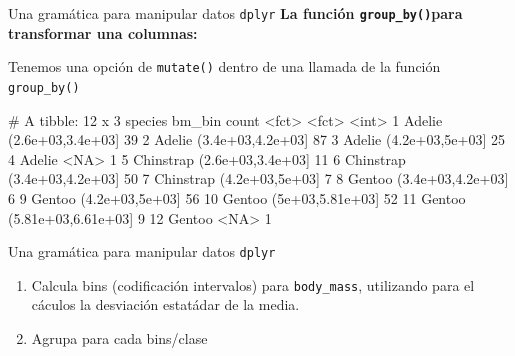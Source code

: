 \documentclass[
  ignorenonframetext,
  aspectratio=169]{beamer}
\newenvironment{Shaded}{\begin{snugshade}}{\end{snugshade}}
\newcommand{\AttributeTok}[1]{\textcolor[rgb]{0.13,0.29,0.53}{#1}}
\newcommand{\DecValTok}[1]{\textcolor[rgb]{0.00,0.00,0.81}{#1}}
\newcommand{\FunctionTok}[1]{\textcolor[rgb]{0.13,0.29,0.53}{\textbf{#1}}}
\newcommand{\NormalTok}[1]{#1}
\newcommand{\OtherTok}[1]{\textcolor[rgb]{0.56,0.35,0.01}{#1}}
\newcommand{\SpecialCharTok}[1]{\textcolor[rgb]{0.81,0.36,0.00}{\textbf{#1}}}
\newcommand{\StringTok}[1]{\textcolor[rgb]{0.31,0.60,0.02}{#1}}
\providecommand{\tightlist}{%
  \setlength{\itemsep}{0pt}\setlength{\parskip}{0pt}}
\let\oldverbatim\verbatim
\let\endoldverbatim\endverbatim
\renewenvironment{verbatim}{\tiny\oldverbatim}{\endoldverbatim}
\begin{document}
\begin{frame}[fragile]{Una gramática para manipular datos
\texttt{dplyr}}
\label{una-gramuxe1tica-para-manipular-datos-dplyr-12}
\textbf{La función \texttt{group\_by()}para transformar una columnas:}

Tenemos una opción de \texttt{mutate()} dentro de una llamada de la
función \texttt{group\_by()}

\begin{Shaded}
\end{Shaded}

\begin{verbatim}
# A tibble: 12 x 3
   species   bm_bin              count
   <fct>     <fct>               <int>
 1 Adelie    (2.6e+03,3.4e+03]      39
 2 Adelie    (3.4e+03,4.2e+03]      87
 3 Adelie    (4.2e+03,5e+03]        25
 4 Adelie    <NA>                    1
 5 Chinstrap (2.6e+03,3.4e+03]      11
 6 Chinstrap (3.4e+03,4.2e+03]      50
 7 Chinstrap (4.2e+03,5e+03]         7
 8 Gentoo    (3.4e+03,4.2e+03]       6
 9 Gentoo    (4.2e+03,5e+03]        56
10 Gentoo    (5e+03,5.81e+03]       52
11 Gentoo    (5.81e+03,6.61e+03]     9
12 Gentoo    <NA>                    1
\end{verbatim}
\end{frame}

\begin{frame}[fragile]{Una gramática para manipular datos
\texttt{dplyr}}
\label{una-gramuxe1tica-para-manipular-datos-dplyr-13}
\begin{enumerate}
\tightlist
\item
  Calcula bins (codificación intervalos) para \texttt{body\_mass},
  utilizando para el cáculos la desviación estatádar de la media.
\item
  Agrupa para cada bins/clase
\end{enumerate}
\end{frame}
\end{document}
